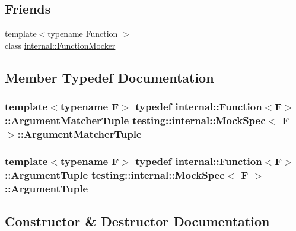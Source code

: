 \subsection*{Friends}
\begin{DoxyCompactItemize}
\item 
{\footnotesize template$<$typename Function $>$ }\\class \hyperlink{classtesting_1_1internal_1_1_mock_spec_a6980863fff8693124aff79c507f87d45}{internal\+::\+Function\+Mocker}
\end{DoxyCompactItemize}


\subsection{Member Typedef Documentation}
\subsubsection[{\texorpdfstring{Argument\+Matcher\+Tuple}{ArgumentMatcherTuple}}]{\setlength{\rightskip}{0pt plus 5cm}template$<$typename F$>$ typedef {\bf internal\+::\+Function}$<$F$>$\+::{\bf Argument\+Matcher\+Tuple} {\bf testing\+::internal\+::\+Mock\+Spec}$<$ F $>$\+::{\bf Argument\+Matcher\+Tuple}}\hypertarget{classtesting_1_1internal_1_1_mock_spec_a35dc5836483cb8c6882c365c447b26cd}{}\label{classtesting_1_1internal_1_1_mock_spec_a35dc5836483cb8c6882c365c447b26cd}
\subsubsection[{\texorpdfstring{Argument\+Tuple}{ArgumentTuple}}]{\setlength{\rightskip}{0pt plus 5cm}template$<$typename F$>$ typedef {\bf internal\+::\+Function}$<$F$>$\+::{\bf Argument\+Tuple} {\bf testing\+::internal\+::\+Mock\+Spec}$<$ F $>$\+::{\bf Argument\+Tuple}}\hypertarget{classtesting_1_1internal_1_1_mock_spec_a7d520daca5d4d937578b4c7e8f0cf43e}{}\label{classtesting_1_1internal_1_1_mock_spec_a7d520daca5d4d937578b4c7e8f0cf43e}


\subsection{Constructor \& Destructor Documentation}
